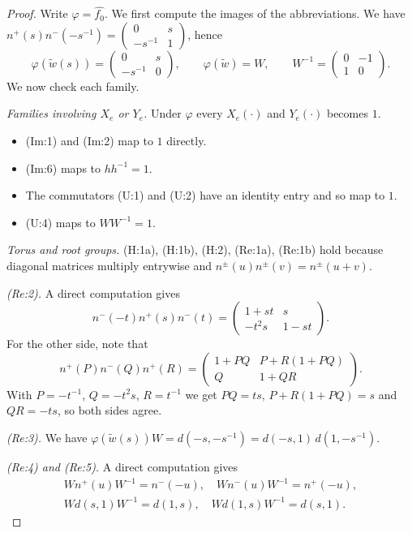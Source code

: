 \documentclass[11pt]{article}
\theoremstyle{definition}
\theoremstyle{remark}
\newcommand{\wt}{\widetilde{w}}
\begin{document}
\begin{proof}
Write $\varphi=\widehat{f_0}$. We first compute the images of the abbreviations. We have $n^+(s)n^-(-s^{-1})=\begin{pmatrix}0&s\\-s^{-1}&1\end{pmatrix}$, hence
\[
\varphi(\wt(s))=\begin{pmatrix}0&s\\-s^{-1}&0\end{pmatrix},\qquad \varphi(\wt)=W,\qquad W^{-1}=\begin{pmatrix}0&-1\\1&0\end{pmatrix}.
\]
We now check each family.

\emph{Families involving $X_e$ or $Y_e$.} Under $\varphi$ every $X_e(\cdot)$ and $Y_e(\cdot)$ becomes $1$.
\begin{itemize}
\item (Im:1) and (Im:2) map to $1$ directly.
\item (Im:6) maps to $hh^{-1}=1$.
\item The commutators (U:1) and (U:2) have an identity entry and so map to $1$.
\item (U:4) maps to $WW^{-1}=1$.
\end{itemize}

\emph{Torus and root groups.} (H:1a), (H:1b), (H:2), (Re:1a), (Re:1b) hold because diagonal matrices multiply entrywise and $n^\pm(u)n^\pm(v)=n^\pm(u+v)$.

\emph{(Re:2).} A direct computation gives
\[
n^-(-t)n^+(s)n^-(t)=\begin{pmatrix}1+st&s\\-t^2s&1-st\end{pmatrix}.
\]
For the other side, note that
\[
n^+(P)n^-(Q)n^+(R)=\begin{pmatrix}1+PQ&P+R(1+PQ)\\Q&1+QR\end{pmatrix}.
\]
With $P=-t^{-1}$, $Q=-t^2s$, $R=t^{-1}$ we get $PQ=ts$, $P+R(1+PQ)=s$ and $QR=-ts$, so both sides agree.

\emph{(Re:3).} We have $\varphi(\wt(s))W=d(-s,-s^{-1})=d(-s,1)\,d(1,-s^{-1})$.

\emph{(Re:4) and (Re:5).} A direct computation gives
\begin{gather*}
Wn^+(u)W^{-1}=n^-(-u),\quad Wn^-(u)W^{-1}=n^+(-u),\\
W d(s,1)W^{-1}=d(1,s),\quad Wd(1,s)W^{-1}=d(s,1).
\end{gather*}


\end{proof}
\end{document}
